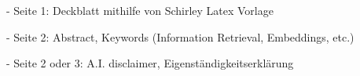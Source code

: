 - Seite 1: Deckblatt mithilfe von Schirley Latex Vorlage

- Seite 2: Abstract, Keywords (Information Retrieval, Embeddings, etc.)

- Seite 2 oder 3: A.I. disclaimer, Eigenständigkeitserklärung